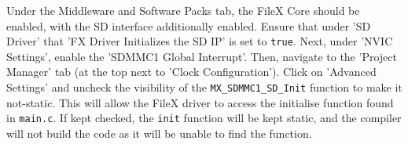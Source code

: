 Under the Middleware and Software Packs tab, the FileX Core should be enabled, with the SD interface additionally enabled. Ensure that under 'SD Driver' that 'FX Driver Initializes the SD IP' is set to \verb|true|.
Next, under 'NVIC Settings', enable the 'SDMMC1 Global Interrupt'.
Then, navigate to the 'Project Manager' tab (at the top next to 'Clock Configuration'). Click on 'Advanced Settings' and uncheck the visibility of the \verb|MX_SDMMC1_SD_Init| function to make it not-static.
This will allow the FileX driver to access the initialise function found in \verb|main.c|. If kept checked, the \verb|init| function will be kept static, and the compiler will not build the code as it will be unable to find the function.